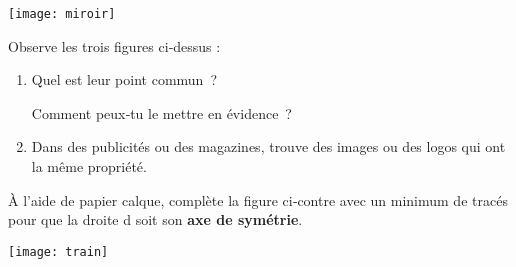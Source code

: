 \begin{activite}
\begin{center} \texttt{[image: miroir]} \end{center}

\begin{partie}
Observe les trois figures ci‑dessus :
\begin{enumerate}
 \item Quel est leur point commun ?
 
Comment peux‑tu le mettre en évidence ?
 \item Dans des publicités ou des magazines, trouve des images ou des logos qui ont la même propriété.
 \end{enumerate}
\end{partie}

\begin{minipage}[c]{0.54\linewidth}
\begin{partie}
À l'aide de papier calque, complète la figure ci‑contre avec un minimum de tracés pour que la droite d soit son \textbf{axe de symétrie}.
\end{partie}
\end{minipage}
\begin{minipage}[c]{0.44\linewidth}
\begin{center} \texttt{[image: train]} \end{center}
\end{minipage} \\

\end{activite}


